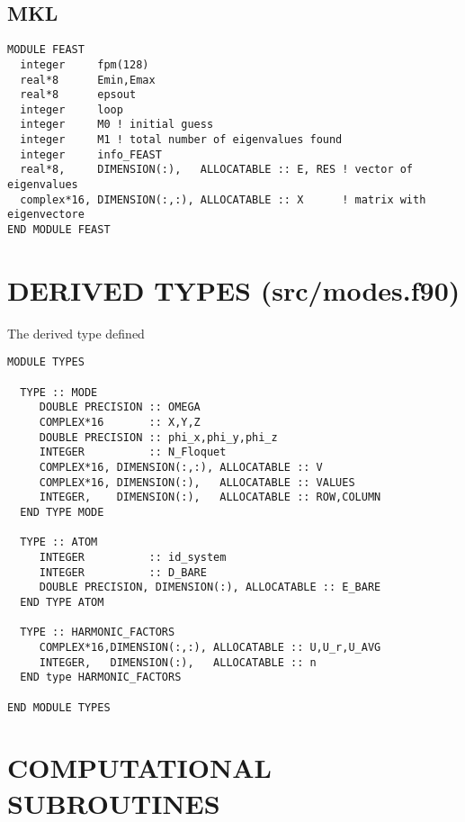 \documentclass[10pt,a4paper]{article}
\begin{document}
\subsection{MKL}

\begin{verbatim}
MODULE FEAST
  integer     fpm(128)
  real*8      Emin,Emax
  real*8      epsout
  integer     loop
  integer     M0 ! initial guess 
  integer     M1 ! total number of eigenvalues found
  integer     info_FEAST
  real*8,     DIMENSION(:),   ALLOCATABLE :: E, RES ! vector of eigenvalues
  complex*16, DIMENSION(:,:), ALLOCATABLE :: X      ! matrix with eigenvectore
END MODULE FEAST
\end{verbatim}

\section{DERIVED TYPES (src/modes.f90)}
\label{sec:derivedtypes}
The derived type defined 
\begin{verbatim}
MODULE TYPES

  TYPE :: MODE
     DOUBLE PRECISION :: OMEGA
     COMPLEX*16       :: X,Y,Z
     DOUBLE PRECISION :: phi_x,phi_y,phi_z
     INTEGER          :: N_Floquet
     COMPLEX*16, DIMENSION(:,:), ALLOCATABLE :: V
     COMPLEX*16, DIMENSION(:),   ALLOCATABLE :: VALUES
     INTEGER,    DIMENSION(:),   ALLOCATABLE :: ROW,COLUMN
  END TYPE MODE
  
  TYPE :: ATOM
     INTEGER          :: id_system
     INTEGER          :: D_BARE
     DOUBLE PRECISION, DIMENSION(:), ALLOCATABLE :: E_BARE
  END TYPE ATOM

  TYPE :: HARMONIC_FACTORS
     COMPLEX*16,DIMENSION(:,:), ALLOCATABLE :: U,U_r,U_AVG
     INTEGER,   DIMENSION(:),   ALLOCATABLE :: n
  END type HARMONIC_FACTORS

END MODULE TYPES
\end{verbatim}

\section{COMPUTATIONAL SUBROUTINES}
\end{document}
